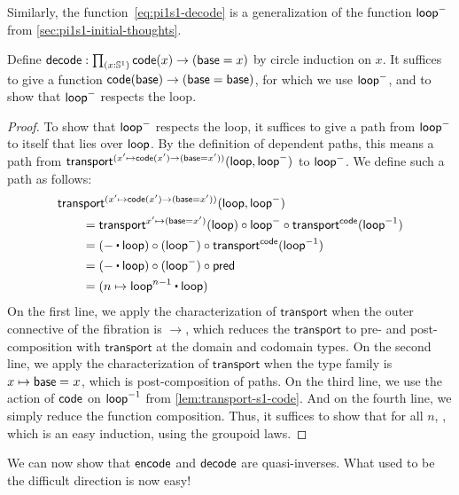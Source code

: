 Similarly, the function~\eqref{eq:pi1s1-decode} is a generalization of the function $\mathsf{loop}^-$ from \autoref{sec:pi1s1-initial-thoughts}.

\begin{defn}\label{thm:pi1s1-decode}
Define $\decode : \prd{x : \Sn ^1}\code(x) \rightarrow (\base=x)$ by 
circle induction on $x$.  It suffices to give a function 
${\mathsf{code}(\mathsf{base}) \rightarrow (\mathsf{base}=\mathsf{base})}$, for which we use $\mathsf{loop}^-$, and 
to show that $\mathsf{loop}^-$ respects the loop.  
\end{defn}

\begin{proof}
To show that $\mathsf{loop}^-$ respects the loop, it suffices to give a path
from $\mathsf{loop}^-$ to itself that lies over $\mathsf{loop}$. 
By the definition of dependent paths, this means a path from $\mathsf{transport}^{(x' \mapsto \mathsf{code}(x')
\rightarrow (\mathsf{base}=x'))}(\mathsf{loop},\mathsf{loop}^-)$ to $\mathsf{loop}^-$.  We define such a
path as follows:
\begin{align*}
  \MoveEqLeft \transfib {(x' \mapsto \code(x') \rightarrow (\base=x'))} \lloop {\lloop^-}\\
&= \transfibf {x'\mapsto (\base=x')}(\lloop) \circ {\lloop^-} \circ \transfibf \code ({\opp \lloop}) \\
&= (- \ct \lloop) \circ (\lloop^-) \circ \transfibf \code ({\opp \lloop}) \\
&= (- \ct \lloop) \circ (\lloop^-) \circ \Zpred \\
&= (n \mapsto \lloop^{n - 1} \ct \lloop)                 
\end{align*}
On the first line, we apply the characterization of $\mathsf{transport}$
when the outer connective of the fibration is $\rightarrow$, which
reduces the $\mathsf{transport}$ to pre- and post-composition with
$\mathsf{transport}$ at the domain and codomain types.  On the second line,
we apply the characterization of $\mathsf{transport}$ when the type family
is $x\mapsto \mathsf{base} =_{} x$, which is post-composition of paths.  On the third line,
we use the action of $\mathsf{code}$ on $\mathord{{\mathsf{loop}}^{-1}}$ from
\autoref{lem:transport-s1-code}.  And on the fourth line, we simply
reduce the function composition.  Thus, it suffices to show that for all
$n$, , which is an easy
induction, using the groupoid laws.  
\end{proof}

We can now show that $\mathsf{encode}$ and $\mathsf{decode}$ are quasi-inverses.
What used to be the difficult direction is now easy!

